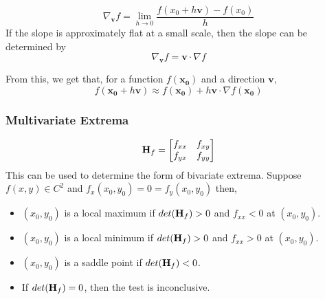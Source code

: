 \begin{equation}
    \nabla_{\mathbf{v}} f = \lim_{h \rightarrow 0}\frac{f(x_0 + h\mathbf{v}) - f(x_0)}{h}
\end{equation}
If the slope is approximately flat at a small scale, then the slope can be determined by
\begin{equation}
    \nabla_{\mathbf{v}} f = \mathbf{v} \cdot \nabla f
\end{equation}

From this, we get that, for a function \(f(\mathbf{x_0})\) and a direction \(\mathbf{v}\),
\begin{equation}
    f(\mathbf{x_0} + h \mathbf{v}) \approx f(\mathbf{x_0}) + h \mathbf{v} \cdot \nabla f(\mathbf{x_0})
\end{equation}

\newpage\subsubsection{Multivariate Extrema}



\begin{equation}
    \mathbf{H}_{f} = \begin{bmatrix} f_{xx} & f_{xy} \\ f_{yx} & f_{yy} \end{bmatrix}
\end{equation}
This can be used to determine the form of bivariate extrema. Suppose \(f(x,y) \in C^2\) and \(f_x(x_0,y_0) = 0 = f_y(x_0,y_0)\) then,
\begin{itemize}
    \item \((x_0,y_0)\) is a local maximum if \(det(\mathbf{H}_{f}) > 0\) and \(f_{xx} < 0\) at \((x_0,y_0)\).
    \item \((x_0,y_0)\) is a local minimum if \(det(\mathbf{H}_{f}) > 0\) and \(f_{xx} > 0\) at \((x_0,y_0)\).
    \item \((x_0,y_0)\) is a saddle point if \(det(\mathbf{H}_{f}) < 0\).
    \item If \(det(\mathbf{H}_{f}) = 0\), then the test is inconclusive.
\end{itemize}

